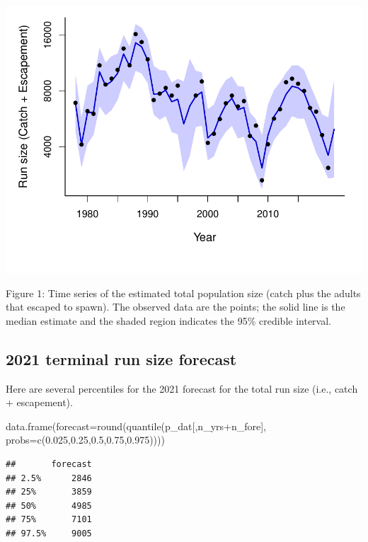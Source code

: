 \documentclass[
  11pt,
]{article}
\newenvironment{Shaded}{}{}
\newcommand{\DataTypeTok}[1]{#1}
\newcommand{\FloatTok}[1]{#1}
\newcommand{\KeywordTok}[1]{\textcolor[rgb]{0.00,0.00,1.00}{#1}}
\newcommand{\NormalTok}[1]{#1}
\newcommand{\OperatorTok}[1]{#1}
\begin{document}
\begin{center}\includegraphics{App_3_Summarize_results_forecast_2020_2021_files/figure-latex/fig_2_run_size-1} \end{center}

Figure 1: Time series of the estimated total population size (catch plus
the adults that escaped to spawn). The observed data are the points; the
solid line is the median estimate and the shaded region indicates the
95\% credible interval.

\hypertarget{terminal-run-size-forecast}{%
\subsection{2021 terminal run size
forecast}\label{terminal-run-size-forecast}}

Here are several percentiles for the 2021 forecast for the total run
size (i.e., catch + escapement).

\begin{Shaded}
\begin{Highlighting}[]
\KeywordTok{data.frame}\NormalTok{(}\DataTypeTok{forecast=}\KeywordTok{round}\NormalTok{(}\KeywordTok{quantile}\NormalTok{(p_dat[,n_yrs}\OperatorTok{+}\NormalTok{n_fore],}
                                   \DataTypeTok{probs=}\KeywordTok{c}\NormalTok{(}\FloatTok{0.025}\NormalTok{,}\FloatTok{0.25}\NormalTok{,}\FloatTok{0.5}\NormalTok{,}\FloatTok{0.75}\NormalTok{,}\FloatTok{0.975}\NormalTok{))))}
\end{Highlighting}
\end{Shaded}

\begin{verbatim}
##       forecast
## 2.5%      2846
## 25%       3859
## 50%       4985
## 75%       7101
## 97.5%     9005
\end{verbatim}
\end{document}
